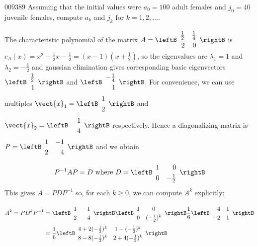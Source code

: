 \begin{example}{}{009389}
Assuming that the initial values were $a_{0} = 100$ adult females and $j_{0} = 40$ juvenile females, compute $a_{k}$ and $j_{k}$ for $k = 1, 2, \dots$.


\begin{solution}
  The characteristic polynomial of the matrix $A = \leftB \begin{array}{rr}
\frac{1}{2} & \frac{1}{4} \\
2 & 0 
\end{array}\rightB$
 is $c_{A}(x) = x^{2} - \frac{1}{2}x - \frac{1}{2} = (x - 1)(x + \frac{1}{2})$, so the eigenvalues are $\lambda_{1} = 1$ and $\lambda_{2} = -\frac{1}{2}$ and gaussian elimination gives corresponding basic eigenvectors $\leftB \begin{array}{r}
\frac{1}{2} \\
1
\end{array}\rightB$
 and $\leftB \begin{array}{r}
-\frac{1}{4} \\
1
\end{array}\rightB$.
 For convenience, we can use multiples $\vect{x}_1 = \leftB \begin{array}{r}
1 \\
2
\end{array}\rightB$
 and $\vect{x}_2 = \leftB \begin{array}{r}
-1 \\
4
\end{array}\rightB$
 respectively. Hence a diagonalizing matrix is $P = \leftB \begin{array}{rr}
1 & -1 \\
2 & 4 
\end{array} \rightB$
 and we obtain
\begin{equation*}
P^{-1}AP=D \mbox{ where } D = \leftB \begin{array}{rr}
1 & 0 \\
0 & -\frac{1}{2}
\end{array}\rightB
\end{equation*}
This gives $A = PDP^{-1}$ so, for each $k \geq 0$, we can compute $A^{k}$ explicitly:


\begin{align*}
A^k = PD^kP^{-1} &= \leftB \begin{array}{rr}
1 & -1 \\
2 & 4 \end{array}\rightB \leftB \begin{array}{cc}
1 & 0 \\
0 & (-\frac{1}{2})^k \end{array}\rightB
\frac{1}{6}
\leftB \begin{array}{rr}
4 & 1 \\
-2 & 1 \end{array}\rightB \\
&= \frac{1}{6}
\leftB \def\arraystretch{1.25}\begin{array}{cc}
4+2(-\frac{1}{2})^k & 1-(-\frac{1}{2})^k \\
8-8(-\frac{1}{2})^k & 2+4(-\frac{1}{2})^k \end{array}\rightB
\end{align*}


\end{solution}
\end{example}

